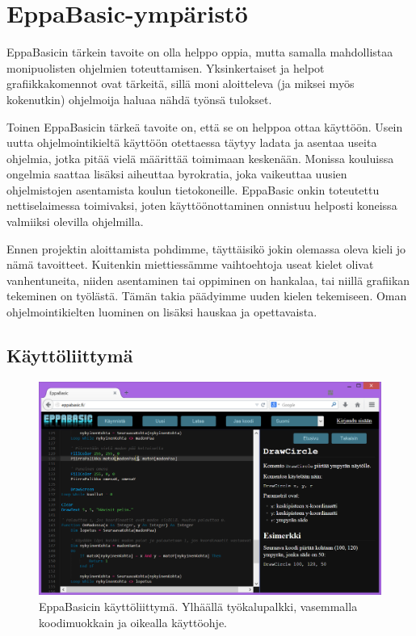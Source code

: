 \section{EppaBasic-ympäristö}
EppaBasicin tärkein tavoite on olla
helppo oppia,
mutta samalla mahdollistaa
monipuolisten ohjelmien toteuttamisen.
Yksinkertaiset ja helpot grafiikkakomennot ovat tärkeitä,
sillä moni aloitteleva (ja miksei myös kokenutkin)
ohjelmoija haluaa nähdä työnsä tulokset.

Toinen EppaBasicin tärkeä tavoite on,
että se on helppoa ottaa käyttöön.
Usein uutta ohjelmointikieltä käyttöön otettaessa
täytyy ladata ja asentaa useita ohjelmia,
jotka pitää vielä määrittää
toimimaan keskenään.
Monissa kouluissa
ongelmia saattaa lisäksi aiheuttaa byrokratia,
joka vaikeuttaa uusien ohjelmistojen asentamista
koulun tietokoneille.
EppaBasic onkin toteutettu
nettiselaimessa toimivaksi, joten
käyttöönottaminen onnistuu
helposti koneissa valmiiksi
olevilla ohjelmilla.

Ennen projektin aloittamista pohdimme,
täyttäisikö jokin olemassa oleva
kieli jo nämä tavoitteet.
Kuitenkin miettiessämme vaihtoehtoja
useat kielet olivat vanhentuneita,
niiden asentaminen tai oppiminen on hankalaa,
tai niillä grafiikan tekeminen on työlästä.
Tämän takia päädyimme uuden kielen tekemiseen.
Oman ohjelmointikielten luominen on lisäksi hauskaa
ja opettavaista.

\subsection{Käyttöliittymä}
\begin{figure}[h]
    \centering
    \includegraphics[width=1\textwidth]{kayttoliittyma}
    \caption{EppaBasicin käyttöliittymä. Ylhäällä työkalupalkki, vasemmalla koodimuokkain ja oikealla käyttöohje.}
    \label{img:kayttoliittyma}
\end{figure}


